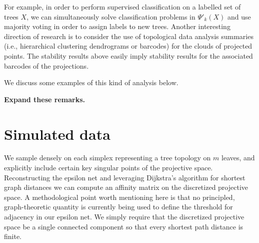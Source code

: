 \documentclass[a4paper,11pt]{article}
\begin{document}
For example, in order to perform supervised classification on a labelled set of trees $X$, we can simultaneously solve classification problems in $\Psi'_k(X)$ and use majority voting in order to assign labels to new trees.
Another interesting direction of research is to consider the use of topological data analysis summaries (i.e., hierarchical clustering dendrograms or barcodes) for the clouds of projected points.
The stability results above easily imply stability results for the associated barcodes of the projections.

We discuss some examples of this kind of analysis below.

{\bf Expand these remarks.}


\section{Simulated data}\label{sec:simulated}

We sample densely on each simplex representing a tree topology on $m$ leaves, and explicitly include certain key singular points of the projective space.
Reconstructing the epsilon net and leveraging Dijkstra's algorithm for shortest graph distances we can compute an affinity matrix on the discretized projective space.
A methodological point worth mentioning here is that no principled, graph-theoretic quantity is currently being used to define the threshold for adjacency in our epsilon net.
We simply require that the discretized projective space be a single connected component so that every shortest path distance is finite.
\end{document}
